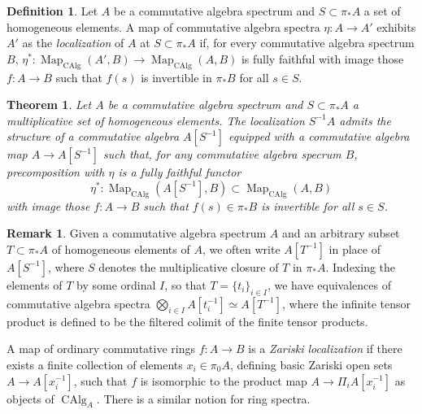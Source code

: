 \documentclass{article}
\newtheorem{theorem}{Theorem}[subsection]
\theoremstyle{definition}
\newtheorem{definition}{Definition}[subsection]
\newtheorem{remark}{Remark}[subsection]
\DeclareMathOperator{\CAlg}{CAlg}
\DeclareMathOperator{\Map}{Map}
\begin{document}
\begin{definition}
Let $A$ be a commutative algebra spectrum and $S\subset\pi_* A$ a set of homogeneous elements.
A map of commutative algebra spectra $\eta:A\to A'$ exhibits $A'$ as the {\em localization} of $A$ at $S\subset\pi_* A$ if, for every commutative algebra spectrum $B$, $\eta^*:\Map_{\CAlg}(A',B)\to\Map_{\CAlg}(A,B)$ is fully faithful with image those $f:A\to B$ such that $f(s)$ is invertible in $\pi_* B$ for all $s\in S$.
\end{definition}
\begin{theorem}{\em \cite[Example 7.5.0.7]{HA}}
Let $A$ be a commutative algebra spectrum and $S\subset\pi_* A$ a multiplicative set of homogeneous elements.
The localization $S^{-1} A$ admits the structure of a commutative algebra $A[S^{-1}]$ equipped with a commutative algebra map $A\to A[S^{-1}]$ such that, for any commutative algebra specrum $B$, precomposition with $\eta$ is a fully faithful functor
\[
\eta^*:\Map_{\CAlg}(A[S^{-1}],B)\subset\Map_{\CAlg}(A,B)
\]
with image those $f:A\to B$ such that $f(s)\in\pi_* B$ is invertible for all $s\in S$.
\end{theorem}

\begin{remark}
Given a commutative algebra spectrum $A$ and an arbitrary subset $T\subset\pi_* A$ of homogeneous elements of $A$, we often write $A[T^{-1}]$ in place of $A[S^{-1}]$, where $S$ denotes the multiplicative closure of $T$ in $\pi_*A$.
Indexing the elements of $T$ by some ordinal $I$, so that $T=\{t_i\}_{i\in I}$, we have equivalences of commutative algebra spectra $\bigotimes_{i\in I} A[t_i^{-1}]\simeq A[T^{-1}]$, where the infinite tensor product is defined to be the filtered colimit of the finite tensor products.
\end{remark}

A map of ordinary commutative rings $f:A\to B$ is a {\em Zariski localization} if there exists a finite collection of elements $x_i\in\pi_0 A$, defining basic Zariski open sets $A\to A[x_i^{-1}]$, such that $f$ is isomorphic to the product map $A\to\Pi_i A[x_i^{-1}]$ as objects of $\CAlg_A$.
There is a similar notion for ring spectra.
\end{document}
